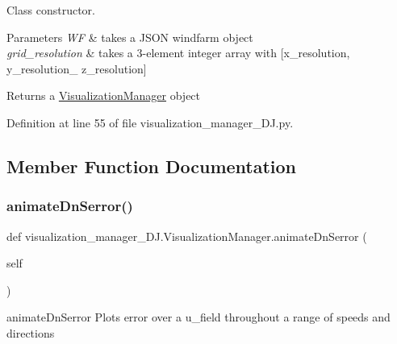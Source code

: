 Class constructor. 


\begin{DoxyParams}{Parameters}
{\em WF} & takes a J\+S\+ON windfarm object \\
\hline
{\em grid\+\_\+resolution} & takes a 3-\/element integer array with \mbox{[}x\+\_\+resolution, y\+\_\+resolution\+\_\+ z\+\_\+resolution\mbox{]} \\
\hline
\end{DoxyParams}
\begin{DoxyReturn}{Returns}
a \mbox{\hyperlink{classvisualization__manager___d_j_1_1_visualization_manager}{Visualization\+Manager}} object 
\end{DoxyReturn}


Definition at line 55 of file visualization\+\_\+manager\+\_\+\+D\+J.\+py.



\subsection{Member Function Documentation}
\mbox{\label{classvisualization__manager___d_j_1_1_visualization_manager_ab660449be49e49325d864dd1176e83f0}} 
\subsubsection{\texorpdfstring{animate\+Dn\+Serror()}{animateDnSerror()}}
{\footnotesize\ttfamily def visualization\+\_\+manager\+\_\+\+D\+J.\+Visualization\+Manager.\+animate\+Dn\+Serror (\begin{DoxyParamCaption}\item[{}]{self }\end{DoxyParamCaption})}



animate\+Dn\+Serror Plots error over a u\+\_\+field throughout a range of speeds and directions 


